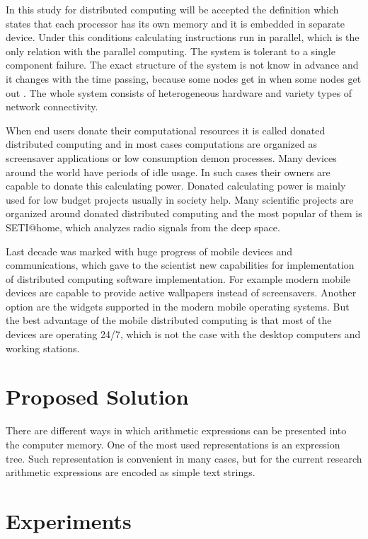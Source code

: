 \documentclass[graybox]{svmult}
\begin{document}
In this study for distributed computing will be accepted the definition which states that each processor has its own memory and it is embedded in separate device. Under this conditions calculating instructions run in parallel, which is the only relation with the parallel computing. The system is tolerant to a single component failure. The exact structure of the system is not know in advance and it changes with the time passing, because some nodes get in when some nodes get out \cite{balabanov02}. The whole system consists of heterogeneous hardware and variety types of network connectivity. 

When end users donate their computational resources it is called donated distributed computing and in most cases computations are organized as screensaver applications or low consumption demon processes. Many devices around the world have periods of idle usage. In such cases their owners are capable to donate this calculating power. Donated calculating power is mainly used for low budget projects usually in society help. Many scientific projects are organized around donated distributed computing and the most popular of them is SETI@home, which analyzes radio signals from the deep space. 

Last decade was marked with huge progress of mobile devices and communications, which gave to the scientist new capabilities for implementation of distributed computing software implementation. For example modern mobile devices are capable to provide active wallpapers instead of screensavers. Another option are the widgets supported in the modern mobile operating systems. But the best advantage of the mobile distributed computing is that most of the devices are operating 24/7, which is not the case with the desktop computers and working stations. 

\section{Proposed Solution} \label{Proposed Solution}

There are different ways in which arithmetic expressions can be presented into the computer memory. One of the most used representations is an expression tree. Such representation is convenient in many cases, but for the current research arithmetic expressions are encoded as simple text strings. 

\section{Experiments} \label{Experiments}
\end{document}
